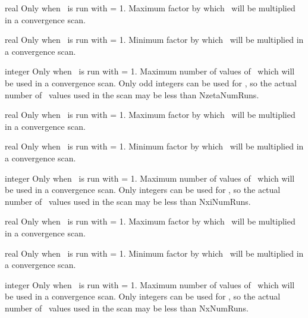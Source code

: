 \myhrule

{real}
{Only when \sfincsScan~is run with  = 1.}
{Maximum factor by which \Nzeta~will be multiplied in a convergence scan.}

\myhrule

{real}
{Only when \sfincsScan~is run with  = 1.}
{Minimum factor by which \Nzeta~will be multiplied in a convergence scan.}

\myhrule

{integer}
{Only when \sfincsScan~is run with  = 1.}
{Maximum number of values of \Nzeta~which will be used in a convergence scan.  Only odd integers can be used
for \Nzeta, so the actual number of \Nzeta~values used in the scan may be less than {\ttfamily NzetaNumRuns}.}

\myhrule

{real}
{Only when \sfincsScan~is run with  = 1.}
{Maximum factor by which \Nxi~will be multiplied in a convergence scan.}

\myhrule

{real}
{Only when \sfincsScan~is run with  = 1.}
{Minimum factor by which \Nxi~will be multiplied in a convergence scan.}

\myhrule

{integer}
{Only when \sfincsScan~is run with  = 1.}
{Maximum number of values of \Nxi~which will be used in a convergence scan.  Only integers can be used
for \Nxi, so the actual number of \Nxi~values used in the scan may be less than {\ttfamily NxiNumRuns}.}

\myhrule

{real}
{Only when \sfincsScan~is run with  = 1.}
{Maximum factor by which \Nx~will be multiplied in a convergence scan.}

\myhrule

{real}
{Only when \sfincsScan~is run with  = 1.}
{Minimum factor by which \Nx~will be multiplied in a convergence scan.}

\myhrule

{integer}
{Only when \sfincsScan~is run with  = 1.}
{Maximum number of values of \Nx~which will be used in a convergence scan.  Only integers can be used
for \Nx, so the actual number of \Nx~values used in the scan may be less than {\ttfamily NxNumRuns}.}

